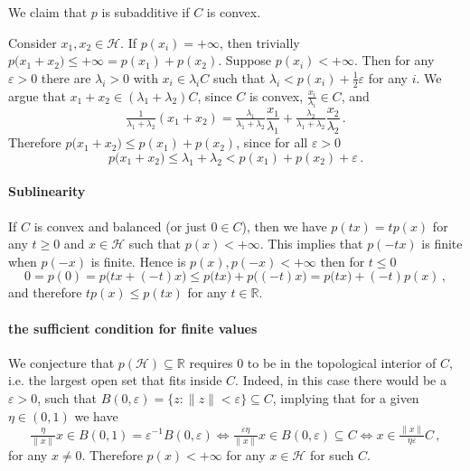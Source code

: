 \documentclass[a4paper]{article}
\newcommand{\Hcal}{\mathcal{H}}
\newcommand{\real}{\mathbb{R}}
\begin{document}
We claim that $p$ is subadditive if $C$ is convex.

Consider $x_1, x_2 \in \Hcal$. If $p(x_i) = +\infty$, then trivially $p\bigl( x_1
+ x_2 \bigr) \leq +\infty =  p(x_1) + p(x_2)$. Suppose $p(x_i) < + \infty$. Then
for any $\varepsilon > 0$ there are $\lambda_i > 0$ with $x_i \in \lambda_i C$ such
that $\lambda_i < p(x_i) + \tfrac12\varepsilon$ for any $i$. We argue that $x_1 + x_2
\in (\lambda_1 + \lambda_2) C$, since $C$ is convex, $\tfrac{x_i}{\lambda_i} \in C$,
and
\begin{equation*}
  \tfrac1{\lambda_1 + \lambda_2} (x_1 + x_2)
    = \tfrac{\lambda_1}{\lambda_1 + \lambda_2} \frac{x_1}{\lambda_1}
      + \tfrac{\lambda_2}{\lambda_1 + \lambda_2} \frac{x_2}{\lambda_2}
    \,.
\end{equation*}
Therefore $p\bigl( x_1 + x_2 \bigr) \leq p(x_1) + p(x_2)$, since for all $\varepsilon
> 0$
\begin{equation*}
  p\bigl( x_1 + x_2 \bigr)
    \leq \lambda_1 + \lambda_2
    < p(x_1) + p(x_2) + \varepsilon
    \,.
\end{equation*}


\paragraph{Sublinearity} %
\label{par:sublinearity}

If $C$ is convex and balanced (or just $0 \in C$), then we have $p(t x) = t p(x)$
for any $t\geq 0$ and $x\in \Hcal$ such that $p(x) < +\infty$. This implies that
$p(-t x)$ is finite when $p(-x)$ is finite. Hence is $p(x), p(-x) < +\infty$ then
for $t \leq 0$
\begin{equation*}
  0 = p(0)
    = p\bigl( t x + (- t) x \bigr)
    \leq p\bigl( t x \bigr) + p\bigl( (- t) x \bigr)
    = p\bigl( t x \bigr) + (- t) p( x )
    \,,
\end{equation*}
and therefore $t p(x) \leq p(t x)$ for any $t\in \real$.


\paragraph{the sufficient condition for finite values} %
\label{par:the_sufficient_condition_for_finite_values}

We conjecture that $p(\Hcal) \subseteq \real$ requires $0$ to be in the topological
interior of $C$, i.e. the largest open set that fits inside $C$. Indeed, in this
case there would be a $\varepsilon > 0$, such that $B(0, \varepsilon) = \{z\colon
\|z\| < \varepsilon\} \subseteq C$, implying that for a given $\eta \in (0, 1)$ we
have
\begin{equation*}
  \tfrac{\eta}{\|x\|} x \in B(0, 1) = \varepsilon^{-1} B(0, \varepsilon)
  \Leftrightarrow
  \tfrac{\varepsilon \eta}{\|x\|} x \in B(0, \varepsilon)
  \subseteq C
  \Leftrightarrow
  x \in \tfrac{\|x\|}{\eta \varepsilon} C
  \,,
\end{equation*}
for any $x\neq 0$. Therefore $p(x) < +\infty$ for any $x\in \Hcal$ for such $C$.
\end{document}
